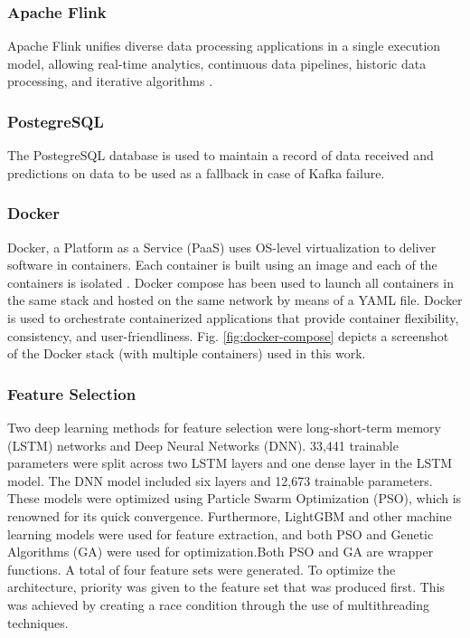\documentclass[runningheads]{llncs}
\begin{document}
\subsubsection{Apache Flink}
Apache Flink unifies diverse data processing applications in a single execution model, allowing real-time analytics, continuous data pipelines, historic data processing, and iterative algorithms \cite{b14}.

\subsubsection{PostegreSQL}
The PostegreSQL database is used to maintain a record of data received and predictions on data to be used as a fallback in case of Kafka failure. 

\subsubsection{Docker}
Docker, a Platform as a Service (PaaS) uses OS-level virtualization to deliver software in containers. Each container is built using an image and each of the containers is isolated \cite{b15}. Docker compose has been used to launch all containers in the same stack and hosted on the same network by means of a YAML file. Docker is used to orchestrate containerized applications that provide container flexibility, consistency, and user-friendliness. Fig. \ref{fig:docker-compose} depicts a screenshot of the Docker stack (with multiple containers) used in this work. 

\subsubsection{Feature Selection}
Two deep learning methods for feature selection were long-short-term memory (LSTM) networks and Deep Neural Networks (DNN). 33,441 trainable parameters were split across two LSTM layers and one dense layer in the LSTM model. The DNN model included six layers and 12,673 trainable parameters.
These models were optimized using Particle Swarm Optimization (PSO), which is renowned for its quick convergence. Furthermore, LightGBM and other machine learning models were used for feature extraction, and both PSO and Genetic Algorithms (GA) were used for optimization.Both PSO and GA are wrapper functions. 
A total of four feature sets were generated. To optimize the architecture, priority was given to the feature set that was produced first. This was achieved by creating a race condition through the use of multithreading techniques.
\end{document}

